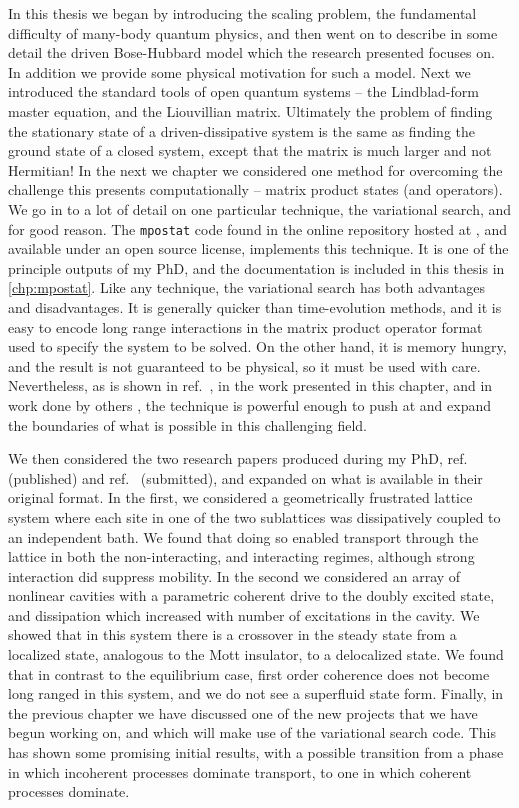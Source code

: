 In this thesis we began by introducing the scaling problem, the fundamental difficulty of many-body quantum physics, and then went on to describe in some detail the driven Bose-Hubbard model which the research presented focuses on. In addition we provide some physical motivation for such a model. Next we introduced the standard tools of open quantum systems -- the Lindblad-form master equation, and the Liouvillian matrix. Ultimately the problem of finding the stationary state of a driven-dissipative system is the same as finding the ground state of a closed system, except that the matrix is much larger and not Hermitian! In the next we chapter we considered one method for overcoming the challenge this presents computationally -- matrix product states (and operators). We go in to a lot of detail on one particular technique, the variational search, and for good reason. The \lstinline$mpostat$ code found in the online repository hosted at \cite{otb:gitVSSS}, and available under an open source license, implements this technique. It is one of the principle outputs of my PhD, and the documentation is included in this thesis in \cref{chp:mpostat}. Like any technique, the variational search has both advantages and disadvantages. It is generally quicker than time-evolution methods, and it is easy to encode long range interactions in the matrix product operator format used to specify the system to be solved. On the other hand, it is memory hungry, and the result is not guaranteed to be physical, so it must be used with care. Nevertheless, as is shown in ref.~\cite{Owen2017}, in the work presented in this chapter, and in work done by others \cite{Cui2015,Mascarenhas2015}, the technique is powerful enough to push at and expand the boundaries of what is possible in this challenging field. 

We then considered the two research papers produced during my PhD, ref.~\cite{Owen2017} (published) and ref.~\cite{Brown2018} (submitted), and expanded on what is available in their original format. In the first, we considered a geometrically frustrated lattice system where each site in one of the two sublattices was dissipatively coupled to an independent bath. We found that doing so enabled transport through the lattice in both the non-interacting, and interacting regimes, although strong interaction did suppress mobility. In the second we considered an array of nonlinear cavities with a parametric coherent drive to the doubly excited state, and dissipation which increased with number of excitations in the cavity. We showed that in this system there is a crossover in the steady state from a localized state, analogous to the Mott insulator, to a delocalized state. We found that in contrast to the equilibrium case, first order coherence does not become long ranged in this system, and we do not see a superfluid state form. Finally, in the previous chapter we have discussed one of the new projects that we have begun working on, and which will make use of the variational search code. This has shown some promising initial results, with a possible transition from a phase in which incoherent processes dominate transport, to one in which coherent processes dominate. 

